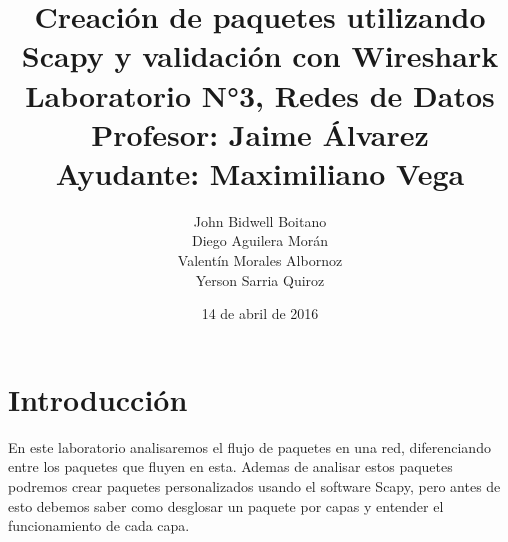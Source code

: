 \documentclass[spanish]{udpreport}
\begin{document}
\title{
	Creación de paquetes utilizando Scapy y validación con Wireshark\\[2ex]
	\normalsize
	Laboratorio N°3, Redes de Datos\\
    Profesor: Jaime Álvarez\\
	Ayudante: Maximiliano Vega
    }
\author{John Bidwell Boitano\\ Diego Aguilera Morán \\ Valentín Morales Albornoz \\ Yerson Sarria Quiroz}
\date{14 de abril de 2016}
\maketitle

\tableofcontents

\chapter{Introducción}
En este laboratorio analisaremos el flujo de paquetes en una red, diferenciando entre los paquetes que fluyen en esta.
Ademas de analisar estos paquetes podremos crear paquetes personalizados usando el software Scapy, pero antes de esto debemos saber como desglosar un paquete por capas y entender el funcionamiento de cada capa.
\end{document}
